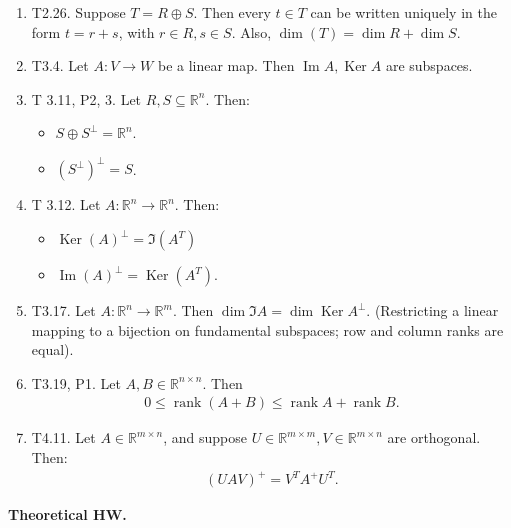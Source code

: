 \documentclass{article}
\newcommand{\RR}{\mathbb{R}}
\DeclareMathOperator{\Ker}{Ker}
\DeclareMathOperator{\Ima}{Im}
\DeclareMathOperator{\Ima}{Im}
\DeclareMathOperator{\rank}{rank}
\begin{document}
\begin{enumerate}
    \item T2.26. Suppose $T = R \oplus S$.  Then every $t \in T$ can be written uniquely in the form $t = r+s$, with $r \in R, s \in S$.  Also, $\dim (T) = \dim R + \dim S$.

    \item T3.4. Let $A: V \to W$ be a linear map.  Then $\Ima A, \Ker A$ are subspaces.

    \item  T 3.11, P2, 3. Let $R, S \subseteq \RR^n$.  Then:

      \begin{itemize}
        \item $S \oplus S^{\perp} = \RR^n$.
        \item $(S^{\perp})^{\perp} = S$.
      \end{itemize}


    \item T 3.12. Let $A: \RR^n \to \RR^n$.  Then:

      \begin{itemize}
        \item $\Ker(A)^{\perp} = \Im (A^T)$
        \item $\Ima (A)^{\perp} = \Ker (A^T)$.
      \end{itemize}

    \item T3.17. Let $A: \RR^n \to \RR^m$. Then $\dim \Im A = \dim \Ker A^{\perp}$. (Restricting a linear mapping to a bijection on fundamental subspaces; row and column ranks are equal).

    \item T3.19, P1. Let $A, B \in \RR^{n \times n}$.  Then
      \begin{align*}
        0 \leq \rank (A+B) \leq \rank A + \rank B.
      \end{align*}

    \item T4.11. Let $A \in \RR^{m \times n}$, and suppose $U \in \RR^{m \times m}, V \in \RR^{m \times n}$ are orthogonal.  Then:
      \begin{align*}
        (U A V)^{+} = V^T A^{+} U^T.
      \end{align*}
\end{enumerate}

{\bf Theoretical HW.}
\end{document}

